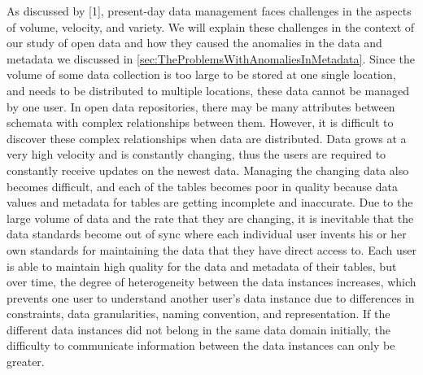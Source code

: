 As discussed by [1], present-day data management faces challenges in the aspects of volume, velocity, and variety. We will explain these challenges in the context of our study of open data and how they caused the anomalies in the data and metadata we discussed in \autoref{sec:TheProblemsWithAnomaliesInMetadata}.
Since the volume of some data collection is too large to be stored at one single location, and needs to be distributed to multiple locations, these data cannot be managed by one user. In open data repositories, there may be many attributes between schemata with complex relationships between them. However, it is difficult to discover these complex relationships when data are distributed.
Data grows at a very high velocity and is constantly changing, thus the users are required to constantly receive updates on the newest data. Managing the changing data also becomes difficult, and each of the tables becomes poor in quality because data values and metadata for tables are getting incomplete and inaccurate.
Due to the large volume of data and the rate that they are changing, it is inevitable that the data standards become out of sync where each individual user invents his or her own standards for maintaining the data that they have direct access to. Each user is able to maintain high quality for the data and metadata of their tables, but over time, the degree of heterogeneity between the data instances increases, which prevents one user to understand another user’s data instance due to differences in constraints, data granularities, naming convention, and representation. If the different data instances did not belong in the same data domain initially, the difficulty to communicate information between the data instances can only be greater.

